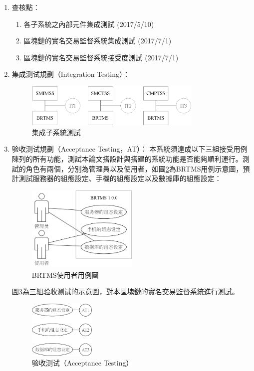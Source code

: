 \begin{enumerate}
			\item 查核點：

				\begin{enumerate}
	 				\item 各子系統之內部元件集成測試 (2017/5/10)
	 				\item 區塊鏈的實名交易監督系統集成測試 (2017/7/1)
	 				\item 區塊鏈的實名交易監督系統接受度測試 (2017/7/1)
	 			\end{enumerate}

	 		\item 集成测试規劃（Integration Testing）：
	 			\begin{figure}[htbp]
					\centering
					\includegraphics[width = 0.8\textwidth]{IntegrationTesting.png}
					\caption{集成子系統測試}\label{IntegrationTesting}
				\end{figure}
			\item 验收测试規劃（Acceptance Testing，AT）：
				本系統須達成以下三組接受用例陳列的所有功能，測試本論文搭設計與搭建的系統功能是否能夠順利運行。測試的角色有兩個，分別為管理員以及使用者，如圖\ref{usecasediagram}為BRTMS用例示意圖，預計測試服務器的組態設定、手機的組態設定以及數據庫的組態設定：

					\begin{figure}[htbp]
						\centering
						\includegraphics[width = 0.5\textwidth]{usecasediagram.png}
						\caption{BRTMS使用者用例圖}\label{usecasediagram}
					\end{figure}

				圖\ref{AcceptanceTesting}為三組验收测试的示意圖，對本區塊鏈的實名交易監督系統進行測試。
					\begin{figure}[htbp]
						\centering
						\includegraphics[width = 0.3\textwidth]{AcceptanceTesting.png}
						\caption{验收测试（Acceptance Testing）}\label{AcceptanceTesting}
					\end{figure}

	 		\end{enumerate}			

